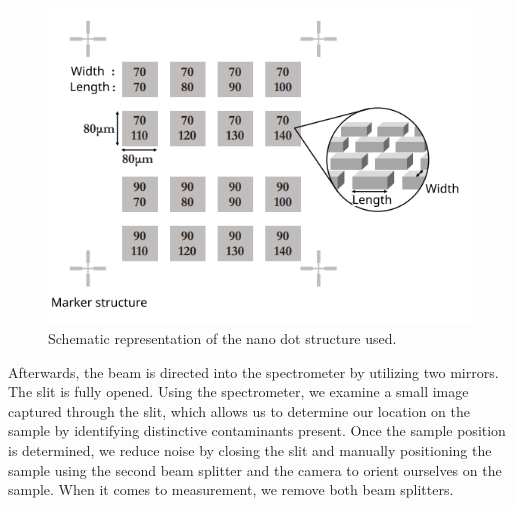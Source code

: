 \begin{figure}[ht]
    \centering
    \includegraphics[width = 0.8\linewidth]{Bilder/Setup/SchemeDots.png}
    \caption{Schematic representation of the nano dot structure used.}
    \label{fig:NanoDotSketch}
\end{figure}

Afterwards, the beam is directed into the spectrometer by utilizing two mirrors. The slit is fully opened. Using the spectrometer, we examine a small image captured through the slit, which allows us to determine our location on the sample by identifying distinctive contaminants present. Once the sample position is determined, we reduce noise by closing the slit and manually positioning the sample using the second beam splitter and the camera to orient ourselves on the sample. When it comes to measurement, we remove both beam splitters.